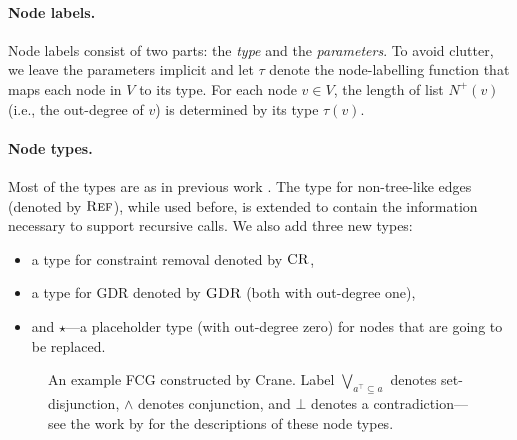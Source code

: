 \paragraph{Node labels.}
Node labels consist of two parts: the \emph{type} and the \emph{parameters}.
To avoid clutter, we leave the parameters implicit and let $\tau$ denote the
node-labelling function that maps each node in $V$ to its type. For each
node $v \in V$, the length of list $N^+(v)$ (i.e., the out-degree of $v$) is
determined by its type $\tau(v)$.

\paragraph{Node types.}
Most of the types are as in previous work
\citep{DBLP:conf/nips/Broeck11,DBLP:conf/ijcai/BroeckTMDR11}. The type for
non-tree-like edges (denoted by $\operatorname{\textsc{Ref}}$), while used before, is extended to
contain the information necessary to support recursive calls. We also add three
new types:
\begin{itemize}
  \item a type for constraint removal denoted by $\operatorname{\textsc{CR}}$,
  \item a type for GDR denoted by $\operatorname{\textsc{GDR}}$ (both with out-degree one),
  \item and $\star$---a placeholder type (with out-degree zero) for nodes that are going to be replaced.
\end{itemize}

\begin{figure}[t]
  \centering
  \caption{An example FCG constructed by Crane. Label
    $\bigvee_{a^\top \subseteq a}$ denotes set-disjunction, $\land$ denotes
    conjunction, and $\bot$ denotes a contradiction---see the work by
    \citet{DBLP:conf/ijcai/BroeckTMDR11} for the descriptions of these node
    types.}\label{fig:examplefcg}
\end{figure}

